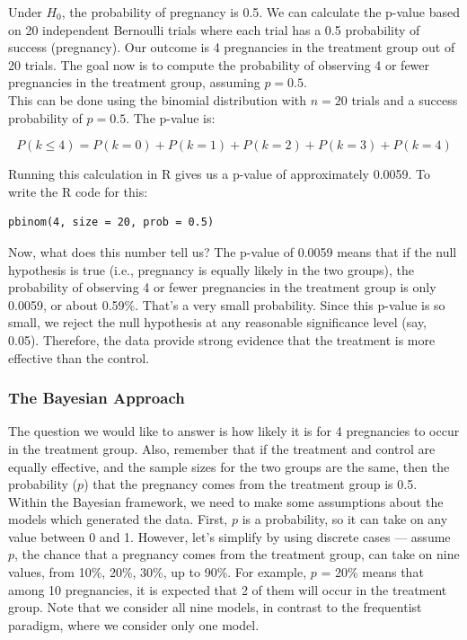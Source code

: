 Under \( H_0 \), the probability of pregnancy is 0.5. We can calculate the p-value based on 20 independent Bernoulli trials where each trial has a 0.5 probability of success (pregnancy). Our outcome is 4 pregnancies in the treatment group out of 20 trials. The goal now is to compute the probability of observing 4 or fewer pregnancies in the treatment group, assuming \( p = 0.5 \).\\

This can be done using the binomial distribution with \( n = 20 \) trials and a success probability of \( p = 0.5 \). The p-value is:

\[
P(k \leq 4) = P(k = 0) + P(k = 1) + P(k = 2) + P(k = 3) + P(k = 4)
\]

Running this calculation in R gives us a p-value of approximately 0.0059. To write the R code for this:\\

\begin{lstlisting}[style=Rstyle, label={lst:frequentist_contraceptive}]
pbinom(4, size = 20, prob = 0.5)
\end{lstlisting}
\vspace{10pt}

Now, what does this number tell us? The p-value of 0.0059 means that if the null hypothesis is true (i.e., pregnancy is equally likely in the two groups), the probability of observing 4 or fewer pregnancies in the treatment group is only 0.0059, or about 0.59\%. That's a very small probability. Since this p-value is so small, we reject the null hypothesis at any reasonable significance level (say, 0.05). Therefore, the data provide strong evidence that the treatment is more effective than the control.

\subsubsection{The Bayesian Approach}

The question we would like to answer is how likely it is for 4 pregnancies to occur in the treatment group. Also, remember that if the treatment and control are equally effective, and the sample sizes for the two groups are the same, then the probability ($p$) that the pregnancy comes from the treatment group is 0.5.\\

Within the Bayesian framework, we need to make some assumptions about the models which generated the data. First, $p$ is a probability, so it can take on any value between 0 and 1. However, let’s simplify by using discrete cases — assume $p$, the chance that a pregnancy comes from the treatment group, can take on nine values, from 10\%, 20\%, 30\%, up to 90\%. For example, $p$ = 20\% means that among 10 pregnancies, it is expected that 2 of them will occur in the treatment group. Note that we consider all nine models, in contrast to the frequentist paradigm, where we consider only one model.

